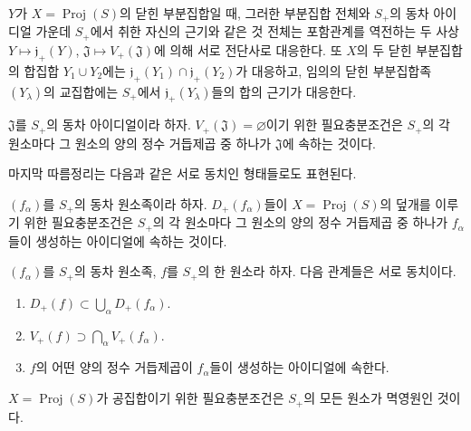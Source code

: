 \begin{corollary}[2.3.12]
\label{II.2.3.12-ko}
$Y$가 $X=\operatorname{Proj}(S)$의 닫힌 부분집합일 때, 그러한 부분집합
전체와 $S_+$의 동차 아이디얼 가운데 $S_+$에서 취한 자신의 근기와 같은
것 전체는 포함관계를 역전하는 두 사상
$Y\longmapsto\mathfrak{j}_+(Y)$,
$\mathfrak{J}\longmapsto V_+(\mathfrak{J})$에 의해 서로 전단사로 대응한다.
또 $X$의 두 닫힌 부분집합의 합집합 $Y_1\cup Y_2$에는
$\mathfrak{j}_+(Y_1)\cap\mathfrak{j}_+(Y_2)$가 대응하고, 임의의 닫힌
부분집합족 $(Y_\lambda)$의 교집합에는 $S_+$에서
$\mathfrak{j}_+(Y_\lambda)$들의 합의 근기가 대응한다.
\end{corollary}

\begin{corollary}[2.3.13]
\label{II.2.3.13-ko}
$\mathfrak{J}$를 $S_+$의 동차 아이디얼이라 하자.
$V_+(\mathfrak{J})=\varnothing$이기 위한 필요충분조건은 $S_+$의 각
원소마다 그 원소의 양의 정수 거듭제곱 중 하나가 $\mathfrak{J}$에 속하는
것이다.
\end{corollary}

마지막 따름정리는 다음과 같은 서로 동치인 형태들로도 표현된다.

\begin{corollary}[2.3.14]
\label{II.2.3.14-ko}
$(f_\alpha)$를 $S_+$의 동차 원소족이라 하자. $D_+(f_\alpha)$들이
$X=\operatorname{Proj}(S)$의 덮개를 이루기 위한 필요충분조건은 $S_+$의
각 원소마다 그 원소의 양의 정수 거듭제곱 중 하나가 $f_\alpha$들이
생성하는 아이디얼에 속하는 것이다.
\end{corollary}

\begin{corollary}[2.3.15]
\label{II.2.3.15-ko}
$(f_\alpha)$를 $S_+$의 동차 원소족, $f$를 $S_+$의 한 원소라 하자.
다음 관계들은 서로 동치이다.
\begin{enumerate}
  \item[\rm a)] $D_+(f)\subset\bigcup_\alpha D_+(f_\alpha)$.
  \item[\rm b)] $V_+(f)\supset\bigcap_\alpha V_+(f_\alpha)$.
  \item[\rm c)] $f$의 어떤 양의 정수 거듭제곱이 $f_\alpha$들이 생성하는
    아이디얼에 속한다.
\end{enumerate}
\end{corollary}

\begin{corollary}[2.3.16]
\label{II.2.3.16-ko}
$X=\operatorname{Proj}(S)$가 공집합이기 위한 필요충분조건은 $S_+$의
모든 원소가 멱영원인 것이다.
\end{corollary}

